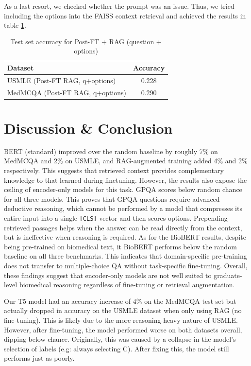 \documentclass{article}
\begin{document}
As a last resort, we checked whether the prompt was an issue. Thus, we tried including the options into the FAISS context retrieval and achieved the results in table \ref{tab:rag_results}.

\begin{table}[h]
    \centering
    \small
    \setlength{\tabcolsep}{4pt} %
    \begin{tabular}{l c}
        \hline
        \textbf{Dataset}                 & \textbf{Accuracy} \\
        \hline
        USMLE (Post-FT RAG, q+options)   & 0.228             \\
        MedMCQA (Post-FT RAG, q+options) & 0.290             \\
        \hline
    \end{tabular}
    \caption{Test set accuracy for Post-FT + RAG (question + options)}
    \label{tab:rag_results}
\end{table}

\section{Discussion \& Conclusion}

BERT (standard) improved over the random baseline by roughly 7\% on MedMCQA and 2\% on USMLE, and RAG-augmented training added 4\% and 2\% respectively. This suggests that retrieved context provides complementary knowledge to that learned during finetuning.
However, the results also expose the ceiling of encoder-only models for this task. GPQA scores below random chance for all three models. This proves that GPQA questions require advanced deductive reasoning, which cannot be performed by a model that compresses its entire input into a single \texttt{[CLS]} vector and then scores options. Prepending retrieved passages helps when the answer can be read directly from the context, but is ineffective when reasoning is required.
As for the BioBERT results, despite being pre-trained on biomedical text, it BioBERT performs below the random baseline on all three benchmarks. This indicates that domain-specific pre-training does not transfer to multiple-choice QA without task-specific fine-tuning.
Overall, these findings suggest that encoder-only models are not well suited to graduate-level biomedical reasoning regardless of fine-tuning or retrieval
augmentation.


Our T5 model had an accuracy increase of $4\%$ on the MedMCQA test set but actually dropped in accuracy on the USMLE dataset when only using RAG (no fine-tuning). This is likely due to the more reasoning-heavy nature of USMLE. However, after fine-tuning, the model performed worse on both datasets overall, dipping below chance. Originally, this was caused by a collapse in the model's selection of labels (e.g: always selecting C). After fixing this, the model still performs just as poorly.
\end{document}
